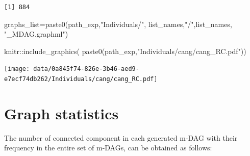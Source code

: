\documentclass[
  letterpaper,
  DIV=11,
  numbers=noendperiod]{scrreprt}
\newenvironment{Shaded}{}{}
\newcommand{\FunctionTok}[1]{\textcolor[rgb]{0.38,0.69,0.94}{#1}}
\newcommand{\NormalTok}[1]{\textcolor[rgb]{0.67,0.70,0.75}{#1}}
\newcommand{\OtherTok}[1]{\textcolor[rgb]{0.15,0.68,0.38}{#1}}
\newcommand{\SpecialCharTok}[1]{\textcolor[rgb]{0.34,0.71,0.76}{#1}}
\newcommand{\StringTok}[1]{\textcolor[rgb]{0.60,0.76,0.47}{#1}}
\begin{document}
\begin{verbatim}
[1] 884
\end{verbatim}

\begin{Shaded}
\begin{Highlighting}[]
\NormalTok{graphs\_list}\OtherTok{=}\FunctionTok{paste0}\NormalTok{(path\_exp,}\StringTok{"Individuals/"}\NormalTok{, list\_names,}\StringTok{"/"}\NormalTok{,list\_names, }\StringTok{"\_MDAG.graphml"}\NormalTok{)}
\end{Highlighting}
\end{Shaded}

\begin{Shaded}
\begin{Highlighting}[]
\NormalTok{knitr}\SpecialCharTok{::}\FunctionTok{include\_graphics}\NormalTok{(}
  \FunctionTok{paste0}\NormalTok{(path\_exp,}\StringTok{"Individuals/cang/cang\_RC.pdf"}\NormalTok{))}
\end{Highlighting}
\end{Shaded}

\texttt{[image: data/0a845f74-826e-3b46-aed9-e7ecf74db262/Individuals/cang/cang\_RC.pdf]}

\section{Graph statistics}\label{graph-statistics}

The number of connected component in each generated m-DAG with their
frequency in the entire set of m-DAGs, can be obtained as follows:
\end{document}
